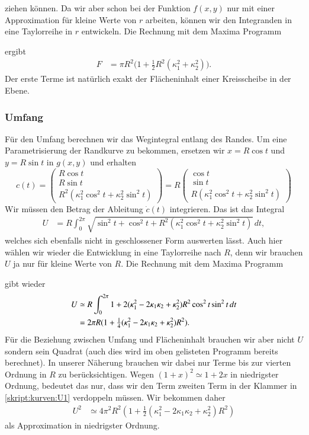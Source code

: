 ziehen können.
Da wir aber schon bei der Funktion $f(x,y)$ nur mit einer Approximation
für kleine Werte von $r$ arbeiten, können wir den Integranden in eine
Taylorreihe in $r$ entwickeln.
Die Rechnung mit dem Maxima Programm

ergibt
\begin{align*}
F
&=
\pi R^2
\bigl(
1
+
{\textstyle\frac12} R^2(\kappa_1^2+\kappa_2^2)
\bigr).
\end{align*}
Der erste Terme ist natürlich exakt der Flächeninhalt einer Kreisscheibe
in der Ebene.

\subsubsection{Umfang}
Für den Umfang berechnen wir das Wegintegral entlang des Randes.
Um eine Parametrisierung der Randkurve zu bekommen,
ersetzen wir $x=R\cos t$ und $y=R\sin t$ in $g(x,y)$ und erhalten
\[
c(t)
=
\begin{pmatrix}
R\cos t\\ R\sin t\\ R^2(\kappa_1^2\cos^2 t + \kappa_2^2\sin^2 t)
\end{pmatrix}
=
R
\begin{pmatrix}
\cos t\\ \sin t\\ R(\kappa_1^2\cos^2 t + \kappa_2^2\sin^2 t)
\end{pmatrix}
\]
Wir müssen den Betrag der Ableitung $\dot c(t)$ integrieren.
Das ist das Integral
\begin{align*}
U
&=
R
\int_0^{2\pi}
\sqrt{
\sin^2 t + \cos^2 t 
+ R^2(\kappa_1^2 \cos^2 t + \kappa_2^2\sin^2 t)
}
\,dt,
\end{align*}
welches sich ebenfalls nicht in geschlossener Form auswerten lässt.
Auch hier wählen wir wieder die Entwicklung in eine Taylorreihe nach $R$,
denn wir brauchen $U$ ja nur für kleine Werte von $R$.
Die Rechnung mit dem Maxima Programm

gibt wieder
\begin{align}
U
&\simeq
R
\int_0^{2\pi}
1 + 2(\kappa_1^2 - 2\kappa_1\kappa_2 + \kappa_2^2)R^2 \cos^2 t\sin^2 t
\,dt
\notag
\\
&=
2\pi R
(
1
+ 
{\textstyle \frac14}(\kappa_1^2 -2\kappa_1\kappa_2+\kappa_2^2) R^2
).
\label{skript:kurven:U1}
\end{align}
Für die Beziehung zwischen Umfang und Flächeninhalt brauchen wir aber nicht
$U$ sondern sein Quadrat (auch dies wird im oben gelisteten Programm bereits
berechnet).
In unserer Näherung brauchen wir dabei nur Terme bis zur vierten Ordnung
in $R$ zu berücksichtigen.
Wegen $(1+x)^2 \simeq 1+2x$ in niedrigster Ordnung, bedeutet das nur,
dass wir den Term zweiten Term in der Klammer in \eqref{skript:kurven:U1}
verdoppeln müssen.
Wir bekommen daher
\begin{align*}
U^2
&\simeq
4\pi^2 R^2(
1
+
{\textstyle \frac12}
(\kappa_1^2-2\kappa_1\kappa_2 + \kappa_2^2)R^2
)
\end{align*}
als Approximation in niedrigster Ordnung.

